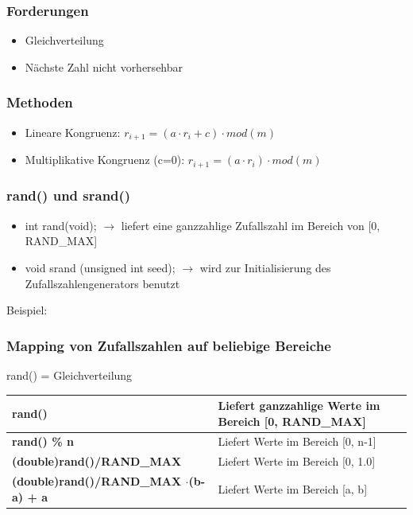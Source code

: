 \subsubsection{Forderungen}
\begin{itemize}
	\item Gleichverteilung
	\item Nächste Zahl nicht vorhersehbar
\end{itemize}

\subsubsection{Methoden}
\begin{itemize}
    \item Lineare Kongruenz: $r_{i+1} = (a \cdot r_i + c)\cdot mod (m)$
    \item Multiplikative Kongruenz (c=0): $r_{i+1} = (a \cdot r_i)\cdot mod (m)$
\end{itemize}

\subsubsection{rand() und srand()}
\begin{itemize}
    \item int rand(void); $\rightarrow$ liefert eine ganzzahlige Zufallszahl im Bereich von [0, RAND\_MAX] 
    \item void srand (unsigned int seed); $\rightarrow$ wird zur Initialisierung des Zufallszahlengenerators benutzt
\end{itemize}
Beispiel: 


\subsubsection{Mapping von Zufallszahlen auf beliebige Bereiche}
rand() = Gleichverteilung\\

\begin{tabular}{|l|l|}
	\hline
	\textbf{rand()} & Liefert ganzzahlige Werte im Bereich [0, RAND\_MAX] \\ 
	\hline
	\textbf{rand() \% n} & Liefert Werte im Bereich [0, n-1] \\
	\hline
	\textbf{(double)rand()/RAND\_MAX} & Liefert Werte im Bereich [0, 1.0] \\ 
	\hline
	\textbf{(double)rand()/RAND\_MAX $\cdot$(b-a) + a} & Liefert Werte im Bereich [a, b] \\
	\hline
\end{tabular} \\\\

